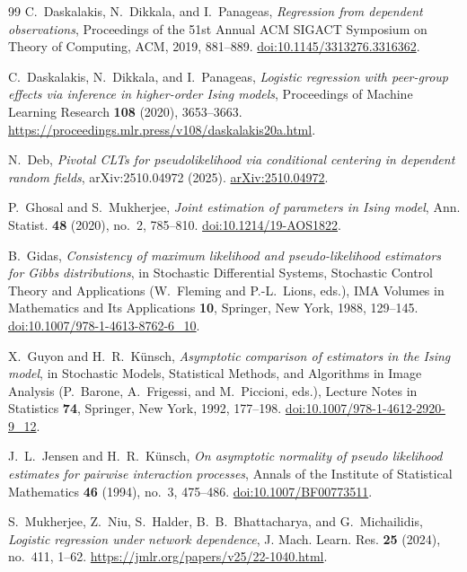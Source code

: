 \documentclass[11pt]{amsart}
\numberwithin{equation}{section}
\theoremstyle{remark}
\begin{document}
\begin{thebibliography}{99}
C.~Daskalakis, N.~Dikkala, and I.~Panageas,
\emph{Regression from dependent observations},
Proceedings of the 51st Annual ACM SIGACT Symposium on Theory of Computing,
ACM, 2019, 881--889.
\href{https://doi.org/10.1145/3313276.3316362}{doi:10.1145/3313276.3316362}.

C.~Daskalakis, N.~Dikkala, and I.~Panageas,
\emph{Logistic regression with peer-group effects via inference in higher-order Ising models},
Proceedings of Machine Learning Research \textbf{108} (2020), 3653--3663.
\url{https://proceedings.mlr.press/v108/daskalakis20a.html}.

N.~Deb,
\emph{Pivotal CLTs for pseudolikelihood via conditional centering in dependent random fields},
arXiv:2510.04972 (2025).
\href{https://arxiv.org/abs/2510.04972}{arXiv:2510.04972}.

P.~Ghosal and S.~Mukherjee,
\emph{Joint estimation of parameters in Ising model},
Ann. Statist. \textbf{48} (2020), no.~2, 785--810.
\href{https://doi.org/10.1214/19-AOS1822}{doi:10.1214/19-AOS1822}.

B.~Gidas,
\emph{Consistency of maximum likelihood and pseudo-likelihood estimators for Gibbs distributions},
in Stochastic Differential Systems, Stochastic Control Theory and Applications
(W.~Fleming and P.-L.~Lions, eds.),
IMA Volumes in Mathematics and Its Applications \textbf{10},
Springer, New York, 1988, 129--145.
\href{https://doi.org/10.1007/978-1-4613-8762-6_10}{doi:10.1007/978-1-4613-8762-6\_10}.

X.~Guyon and H.~R.~K\"unsch,
\emph{Asymptotic comparison of estimators in the Ising model},
in Stochastic Models, Statistical Methods, and Algorithms in Image Analysis
(P.~Barone, A.~Frigessi, and M.~Piccioni, eds.),
Lecture Notes in Statistics \textbf{74},
Springer, New York, 1992, 177--198.
\href{https://doi.org/10.1007/978-1-4612-2920-9_12}{doi:10.1007/978-1-4612-2920-9\_12}.

J.~L.~Jensen and H.~R.~K\"unsch,
\emph{On asymptotic normality of pseudo likelihood estimates for pairwise interaction processes},
Annals of the Institute of Statistical Mathematics \textbf{46} (1994), no.~3, 475--486.
\href{https://doi.org/10.1007/BF00773511}{doi:10.1007/BF00773511}.

S.~Mukherjee, Z.~Niu, S.~Halder, B.~B.~Bhattacharya, and G.~Michailidis,
\emph{Logistic regression under network dependence},
J. Mach. Learn. Res. \textbf{25} (2024), no.~411, 1--62.
\url{https://jmlr.org/papers/v25/22-1040.html}.


\end{thebibliography}
\end{document}
